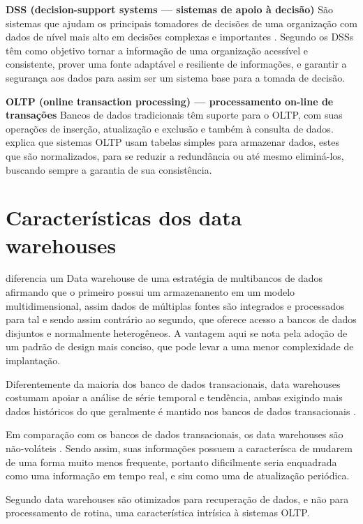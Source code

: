 \textbf{DSS (decision-support systems — sistemas de apoio à decisão)}
São sistemas que ajudam os principais tomadores de decisões de uma organização com dados de nível mais alto em decisões complexas e importantes \cite{elmasri_sistemas_2011}. Segundo   os DSSs têm como objetivo tornar a informação de uma organização acessível e consistente, prover uma fonte adaptável e resiliente de informações, e garantir a segurança aos dados para assim ser um sistema base para a tomada de decisão.

\textbf{OLTP (online transaction processing) — processamento on-line de transações }
Bancos de dados tradicionais têm suporte para o OLTP, com suas operações de inserção, atualização e exclusão e também à consulta de dados.  explica que sistemas OLTP usam tabelas simples para armazenar dados, estes que são normalizados, para se reduzir a redundância ou até mesmo eliminá-los, buscando sempre a garantia de sua consistência.


\section{Características dos data warehouses}\label{sec:caract-dw}


 diferencia um Data warehouse de uma estratégia de multibancos de dados afirmando que o primeiro possui um armazenanento em um modelo multidimensional, assim dados de múltiplas fontes são integrados e processados para tal e sendo assim contrário ao segundo, que oferece acesso a bancos de dados disjuntos e normalmente heterogêneos. 
A vantagem aqui se nota pela adoção de um padrão de design mais conciso, que pode levar a uma menor complexidade de implantação.

Diferentemente da maioria dos banco de dados transacionais, data warehouses costumam apoiar a análise de série temporal e tendência, ambas exigindo mais dados históricos do que geralmente é mantido nos bancos de dados transacionais \cite{elmasri_sistemas_2011}.

Em comparação com os bancos de dados transacionais, os data warehouses são não-voláteis \cite{elmasri_sistemas_2011}. Sendo assim, suas informações possuem a caracterísca de mudarem de uma forma muito menos frequente, portanto dificilmente seria enquadrada como uma informação em tempo real, e sim como uma de atualização periódica.

Segundo  data warehouses são otimizados para recuperação de dados, e não para processamento de rotina, uma característica intrísica à sistemas OLTP.


